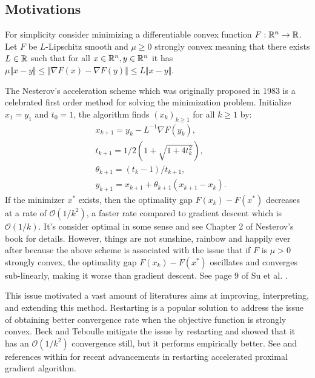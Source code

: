 \documentclass[12pt]{article}
\begin{document}
    \subsection{Motivations}
        For simplicity consider minimizing a differentiable convex function $F: \mathbb R^n \rightarrow \mathbb R$. 
        Let $F$ be $L$-Lipschitz smooth and $\mu \ge 0$ strongly convex meaning that there exists $L \in \mathbb R$ such that for all $x \in \mathbb R^n, y\in \mathbb R^n$ it has $\mu\Vert x - y\Vert\le \Vert \nabla F(x) - \nabla F(y)\Vert \le L \Vert x - y \Vert$. 
        \par 
        The Nesterov's acceleration scheme which was originally proposed in 1983 \cite{nesterov_method_1983} is a celebrated first order method for solving the minimization problem. 
        Initialize $x_1 = y_1$ and $t_0 = 1$, the algorithm finds $(x_k)_{k \ge 1}$ for all $k \ge 1$ by: 
        \begin{align}
            & x_{k + 1} = y_k - L^{-1}\nabla F(y_k), 
            \\
            & t_{k + 1} = 1/2\left(1 + \sqrt{1 + 4t_{k}^2}\right), 
            \\
            & \theta_{k + 1} = (t_{k} - 1)/t_{k + 1}, 
            \\
            & y_{k + 1} = x_{k + 1} + \theta_{k + 1}(x_{k + 1} - x_k). 
        \end{align}\label{eqn:example_algorithm}
        If the minimizer $x^*$ exists, then the optimality gap $F(x_k) - F(x^*)$ decreases at a rate of $\mathcal O(1/k^2)$, a faster rate compared to gradient descent which is $\mathcal O(1/k)$. 
        It's consider optimal in some sense and see Chapter 2 of Nesterov's book \cite{nesterov_lectures_2018} for details. 
        However, things are not sunshine, rainbow and happily ever after because the above scheme is associated with the issue that if $F$ is $\mu > 0$ strongly convex, the optimality gap $F(x_k) - F(x^*)$ oscillates and converges sub-linearly, making it worse than gradient descent. See page 9 of Su et al. \cite{su_differential_2016}. 
        \par
        This issue motivated a vast amount of literatures aims at improving, interpreting, and extending this method. 
        Restarting is a popular solution to address the issue of obtaining better convergence rate when the objective function is strongly convex. 
        Beck and Teboulle \cite{beck_fast_2009} mitigate the issue by restarting and showed that it has an $\mathcal O(1/k^2)$ convergence still, but it performs empirically better. 
        See \cite{necoara_linear_2019}\cite{aujol_parameter-free_2024} and references within for recent advancements in restarting accelerated proximal gradient algorithm. 
        
\end{document}
